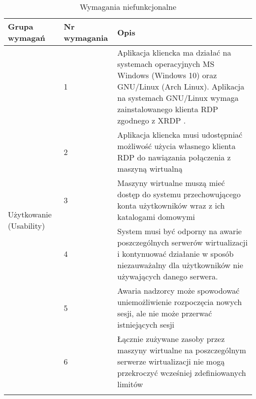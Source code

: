 \documentclass[../wstep.tex]{subfiles}
\begin{document}
\label{requirements:nonfunctional}

\begin{table}[H]
    \caption[Opis skrócony]{Wymagania niefunkcjonalne}
    \label{non-functional}
    \centering
    \begin{tabular}{|p{}|p{}|p{}|}
        \hline Grupa wymagań                            & Nr wymagania & Opis                                                                                                                                                                                                                       \\ \hline
        \multirow[t]{10}{=}{Użytkowanie (Usability)}    & 1            & Aplikacja kliencka ma działać na systemach operacyjnych MS Windows (Windows 10) oraz GNU/Linux (Arch Linux). Aplikacja na systemach GNU/Linux wymaga zainstalowanego klienta RDP zgodnego z XRDP \parencite{xrdp-clients}. \\ \cline{2-3}
                                                        & 2            & Aplikacja kliencka musi udostępniać możliwość użycia własnego klienta RDP do nawiązania połączenia z maszyną wirtualną                                                                                                     \\ \cline{2-3}
                                                        & 3            & Maszyny wirtualne muszą mieć dostęp do systemu przechowującego konta użytkowników wraz z ich katalogami domowymi                                                                                                           \\ \hline
        \multirow[t]{7}{=}{Niezawodność (Reliability)}  & 4            & System musi być odporny na awarie poszczególnych serwerów wirtualizacji i kontynuować działanie w sposób niezauważalny dla użytkowników nie używających danego serwera.                                                    \\ \cline{2-3}
                                                        & 5            & Awaria nadzorcy może spowodować uniemożliwienie rozpoczęcia nowych sesji, ale nie może przerwać istniejących sesji                                                                                                         \\ \hline
        \multirow[t]{10}{=}{Wydajność (Performance)}    & 6            & Łącznie zużywane zasoby przez maszyny wirtualne na poszczególnym serwerze wirtualizacji nie mogą przekroczyć wcześniej zdefiniowanych limitów                                                                              \\ \cline{2-3}

\end{tabular}
\end{table}
\end{document}
